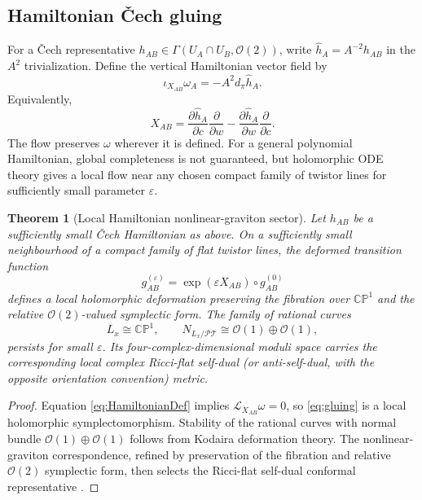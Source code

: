 \documentclass[aps,prd,reprint,nofootinbib,superscriptaddress]{revtex4-2}
\newtheorem{theorem}{Theorem}[section]
\theoremstyle{definition}
\theoremstyle{remark}
\newcommand{\CP}{\mathbb{CP}}
\newcommand{\cO}{\mathcal{O}}
\newcommand{\PT}{\mathcal{PT}}
\newcommand{\eps}{\varepsilon}
\begin{document}
\subsection{Hamiltonian \v{C}ech gluing}

For a \v{C}ech representative $h_{AB}\in\Gamma(U_A\cap U_B,\cO(2))$, write $\widehat h_A=A^{-2}h_{AB}$ in the $A^2$ trivialization. Define the vertical Hamiltonian vector field by
\begin{equation}
\iota_{X_{AB}}\omega_A=-A^2d_\pi\widehat h_A.
\label{eq:HamiltonianDef}
\end{equation}
Equivalently,
\begin{equation}
X_{AB}
=\frac{\partial\widehat h_A}{\partial c}\frac{\partial}{\partial w}
-\frac{\partial\widehat h_A}{\partial w}\frac{\partial}{\partial c}.
\label{eq:Xhlocal}
\end{equation}
The flow preserves $\omega$ wherever it is defined. For a general polynomial Hamiltonian, global completeness is not guaranteed, but holomorphic ODE theory gives a local flow near any chosen compact family of twistor lines for sufficiently small parameter $\eps$.

\begin{theorem}[Local Hamiltonian nonlinear-graviton sector]
\label{thm:twistor}
Let $h_{AB}$ be a sufficiently small \v{C}ech Hamiltonian as above. On a sufficiently small neighbourhood of a compact family of flat twistor lines, the deformed transition function
\begin{equation}
g_{AB}^{(\eps)}
=\exp(\eps X_{AB})\circ g_{AB}^{(0)}
\label{eq:gluing}
\end{equation}
defines a local holomorphic deformation preserving the fibration over $\CP^1$ and the relative $\cO(2)$-valued symplectic form. The family of rational curves
\[
L_x\cong\CP^1,
\qquad
N_{L_x/\PT}\cong\cO(1)\oplus\cO(1),
\]
persists for small $\eps$. Its four-complex-dimensional moduli space carries the corresponding local complex Ricci-flat self-dual (or anti-self-dual, with the opposite orientation convention) metric.
\end{theorem}

\begin{proof}
Equation \eqref{eq:HamiltonianDef} implies $\mathcal L_{X_{AB}}\omega=0$, so \eqref{eq:gluing} is a local holomorphic symplectomorphism. Stability of the rational curves with normal bundle $\cO(1)\oplus\cO(1)$ follows from Kodaira deformation theory. The nonlinear-graviton correspondence, refined by preservation of the fibration and relative $\cO(2)$ symplectic form, then selects the Ricci-flat self-dual conformal representative \cite{Penrose1976,HitchinKarlhede1987}.
\end{proof}
\end{document}
